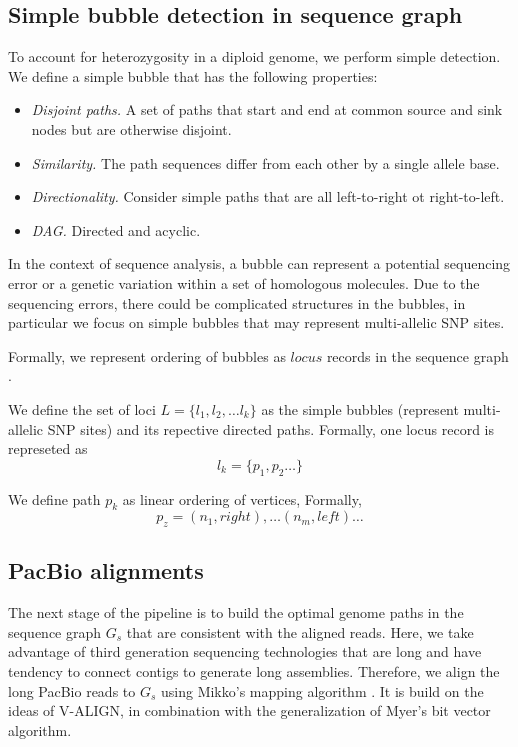 \subsection{Simple bubble detection in sequence graph} To account for heterozygosity in a diploid genome, we perform simple detection.  We define a simple bubble that has the following properties:
\begin{itemize}
 \item \textit{Disjoint paths.} A set of paths that start and end at common source and sink nodes but are otherwise disjoint. 
 \item \textit{Similarity.} The path sequences differ from each other by a single allele base.
 \item \textit{Directionality.} Consider simple paths that are all left-to-right ot right-to-left.
 \item \textit{DAG.} Directed and acyclic.
\end{itemize}

In the context of sequence analysis, a bubble can represent a potential sequencing error or a genetic variation within a set of homologous molecules.
Due to the sequencing errors, there could be complicated structures in the bubbles, in particular we focus on simple bubbles that may represent multi-allelic SNP sites.


Formally, we represent ordering of bubbles as $locus$ records in the sequence graph .
\begin{definition}[Locus]
We define the set of loci $L=\{l_1, l_2, \ldots l_k\}$ as the simple bubbles (represent multi-allelic SNP sites) and its repective directed paths.
Formally, one locus record is represeted as 
\[l_k= \{p_1,p_2 \ldots\}\]

\end{definition}

\begin{definition}[Path] We define path $p_k$ as linear ordering of vertices, Formally,
\[p_z=(n_1,right), \ldots (n_m,left) \ldots\] 

\end{definition}

\subsection{PacBio alignments} The next stage of the pipeline is to build the optimal genome paths in the sequence graph $G_s$ that are consistent with the aligned reads. 
Here, we take advantage of third generation sequencing technologies that are long and have tendency to connect contigs to generate long assemblies.
Therefore, we align the long PacBio reads to $G_s$ using Mikko's mapping algorithm \citep{ ...}. It is build on the ideas of V-ALIGN, in combination with the generalization of Myer's bit vector algorithm. 

